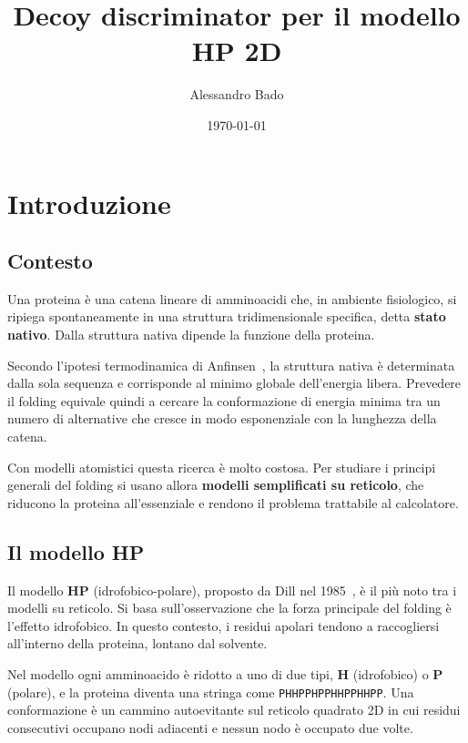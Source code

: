 \documentclass[11pt,a4paper]{article}
\title{Decoy discriminator per il modello HP 2D}
\author{Alessandro Bado}
\date{\today}
\begin{document}
\maketitle


\section{Introduzione}
\label{sec:intro}

\subsection{Contesto}
\label{sec:contesto}

Una proteina è una catena lineare di amminoacidi che, in ambiente fisiologico, si ripiega spontaneamente in una struttura tridimensionale specifica, detta \textbf{stato nativo}. Dalla struttura nativa dipende la funzione della proteina.

Secondo l'ipotesi termodinamica di Anfinsen~\cite{anfinsen1973}, la struttura nativa è determinata dalla sola sequenza e corrisponde al minimo globale dell'energia libera. Prevedere il folding equivale quindi a cercare la conformazione di energia minima tra un numero di alternative che cresce in modo esponenziale con la lunghezza della catena.

Con modelli atomistici questa ricerca è molto costosa. Per studiare i principi generali del folding si usano allora \textbf{modelli semplificati su reticolo}, che riducono la proteina all'essenziale e rendono il problema trattabile al calcolatore.

\subsection{Il modello HP}
\label{sec:hp}

Il modello \textbf{HP} (idrofobico-polare), proposto da Dill nel 1985~\cite{dill1985}, è il più noto tra i modelli su reticolo. Si basa sull'osservazione che la forza principale del folding è l'effetto idrofobico. In questo contesto, i residui apolari tendono a raccogliersi all'interno della proteina, lontano dal solvente.

Nel modello ogni amminoacido è ridotto a uno di due tipi, \textbf{H} (idrofobico) o \textbf{P} (polare), e la proteina diventa una stringa come \texttt{PHHPPHPPHHPPHHPP}. Una conformazione è un cammino autoevitante sul reticolo quadrato 2D in cui residui consecutivi occupano nodi adiacenti e nessun nodo è occupato due volte.
\end{document}

